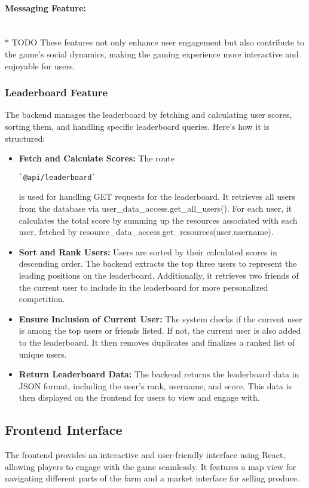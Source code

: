 \documentclass[12pt]{article}
\begin{document}
\paragraph{Messaging Feature:}
\\ $\ast$ TODO
These features not only enhance user engagement but also contribute to the game's social dynamics, making the gaming experience more interactive and enjoyable for users.
\subsubsection{Leaderboard Feature}
The backend manages the leaderboard by fetching and calculating user scores, sorting them, and handling specific leaderboard queries. Here's how it is structured:
\begin{itemize}
    \item \textbf{Fetch and Calculate Scores:} The route \begin{verbatim}`@api/leaderboard`\end{verbatim} is used for handling GET requests for the leaderboard. It retrieves all users from the database via user\_data\_access.get\_all\_users(). For each user, it calculates the total score by summing up the resources associated with each user, fetched by resource\_data\_access.get\_resources(user.username).
    \item \textbf{Sort and Rank Users:} Users are sorted by their calculated scores in descending order. The backend extracts the top three users to represent the leading positions on the leaderboard. Additionally, it retrieves two friends of the current user to include in the leaderboard for more personalized competition.
    \item \textbf{Ensure Inclusion of Current User:} The system checks if the current user is among the top users or friends listed. If not, the current user is also added to the leaderboard. It then removes duplicates and finalizes a ranked list of unique users.
    \item \textbf{Return Leaderboard Data:} The backend returns the leaderboard data in JSON format, including the user's rank, username, and score. This data is then displayed on the frontend for users to view and engage with.
\end{itemize}

\subsection{Frontend Interface}
The frontend provides an interactive and user-friendly interface using React, allowing players to engage with the game seamlessly. It features a map view for navigating different parts of the farm and a market interface for selling produce.
\end{document}
